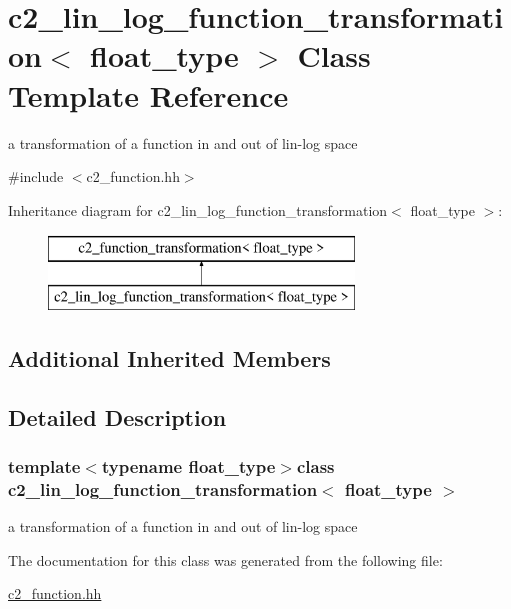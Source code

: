 \hypertarget{classc2__lin__log__function__transformation}{\section{c2\-\_\-lin\-\_\-log\-\_\-function\-\_\-transformation$<$ float\-\_\-type $>$ Class Template Reference}
\label{classc2__lin__log__function__transformation}
}


a transformation of a function in and out of lin-\/log space  




{\ttfamily \#include $<$c2\-\_\-function.\-hh$>$}

Inheritance diagram for c2\-\_\-lin\-\_\-log\-\_\-function\-\_\-transformation$<$ float\-\_\-type $>$\-:\begin{figure}[H]
\begin{center}
\leavevmode
\includegraphics[height=2.000000cm]{classc2__lin__log__function__transformation}
\end{center}
\end{figure}
\subsection*{Additional Inherited Members}


\subsection{Detailed Description}
\subsubsection*{template$<$typename float\-\_\-type$>$class c2\-\_\-lin\-\_\-log\-\_\-function\-\_\-transformation$<$ float\-\_\-type $>$}

a transformation of a function in and out of lin-\/log space 



The documentation for this class was generated from the following file\-:\begin{DoxyCompactItemize}
\item 
\hyperlink{c2__function_8hh}{c2\-\_\-function.\-hh}\end{DoxyCompactItemize}
